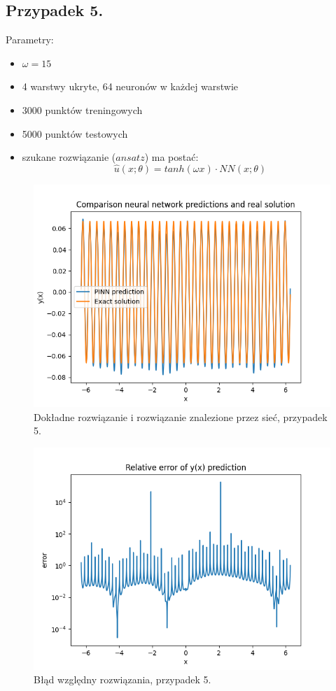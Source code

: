 \documentclass[11pt, leqno]{scrartcl}
\begin{document}
    \subsection{Przypadek 5.}
    Parametry:
    \begin{itemize}
        \item $\omega =15$
        \item 4 warstwy ukryte, 64 neuronów w każdej warstwie
        \item 3000 punktów treningowych
        \item 5000 punktów testowych
        \item szukane rozwiązanie ($ansatz$) ma postać:
            \[
                \hat{u}(x;\theta)=tanh(\omega x)\cdot NN(x;\theta)
            \]
    \end{itemize}
    \begin{figure}[H]
        \centering
        \includegraphics[width=0.7\linewidth]{nn_c_f.png}
        \caption{Dokładne rozwiązanie i rozwiązanie znalezione
            przez sieć, przypadek 5.}
    \end{figure}
    \begin{figure}[H]
        \centering
        \includegraphics[width=0.7\linewidth]{nn_c_err.png}
        \caption{Błąd względny rozwiązania, przypadek 5.}
    \end{figure}
\end{document}
